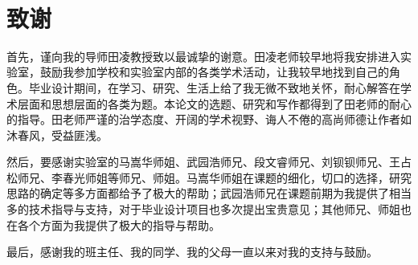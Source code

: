 \documentclass[12pt,a4paper]{article}
\newcommand{\xiaosihao}{\fontsize{12pt}{\baselineskip}\selectfont}
\newcommand{\wuhao}{\fontsize{10.5pt}{\baselineskip}\selectfont}
\begin{document}
\newpage	
{}
\listoftables

\newpage
{}%
\wuhao %
\setlength{\baselineskip}{17pt} %
\renewcommand\refname{参考文献}\

	

\newpage
\section*{致\quad 谢}


\setlength{\baselineskip}{20pt} %
\xiaosihao
{
首先，谨向我的导师田凌教授致以最诚挚的谢意。田凌老师较早地将我安排进入实验室，鼓励我参加学校和实验室内部的各类学术活动，让我较早地找到自己的角色。毕业设计期间，在学习、研究、生活上给了我无微不致地关怀，耐心解答在学术层面和思想层面的各类为题。本论文的选题、研究和写作都得到了田老师的耐心的指导。田老师严谨的治学态度、开阔的学术视野、诲人不倦的高尚师德让作者如沐春风，受益匪浅。

然后，要感谢实验室的马嵩华师姐、武园浩师兄、段文睿师兄、刘钡钡师兄、王占松师兄、李春光师姐等师兄、师姐。马嵩华师姐在课题的细化，切口的选择，研究思路的确定等多方面都给予了极大的帮助；武园浩师兄在课题前期为我提供了相当多的技术指导与支持，对于毕业设计项目也多次提出宝贵意见；其他师兄、师姐也在各个方面为我提供了极大的指导与帮助。

最后，感谢我的班主任、我的同学、我的父母一直以来对我的支持与鼓励。
}
\clearpage
\end{document}
